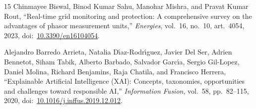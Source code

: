 \documentclass[12pt,a4paper]{report}
\begin{document}
\begin{thebibliography}{15}
Chinmayee Biswal, Binod Kumar Sahu, Manohar Mishra, and Pravat Kumar Rout, ``Real-time grid monitoring and protection: A comprehensive survey on the advantages of phasor measurement units,'' \textit{Energies}, vol.~16, no.~10, art.~4054, 2023, doi:~\href{https://doi.org/10.3390/en16104054}{10.3390/en16104054}.

Alejandro Barredo Arrieta, Natalia D\'{\i}az-Rodr\'{\i}guez, Javier Del Ser, Adrien Bennetot, Siham Tabik, Alberto Barbado, Salvador Garc\'{\i}a, Sergio Gil-Lopez, Daniel Molina, Richard Benjamins, Raja Chatila, and Francisco Herrera, ``Explainable Artificial Intelligence (XAI): Concepts, taxonomies, opportunities and challenges toward responsible AI,'' \textit{Information Fusion}, vol.~58, pp.~82--115, 2020, doi:~\href{https://doi.org/10.1016/j.inffus.2019.12.012}{10.1016/j.inffus.2019.12.012}.

\end{thebibliography}
\end{document}
